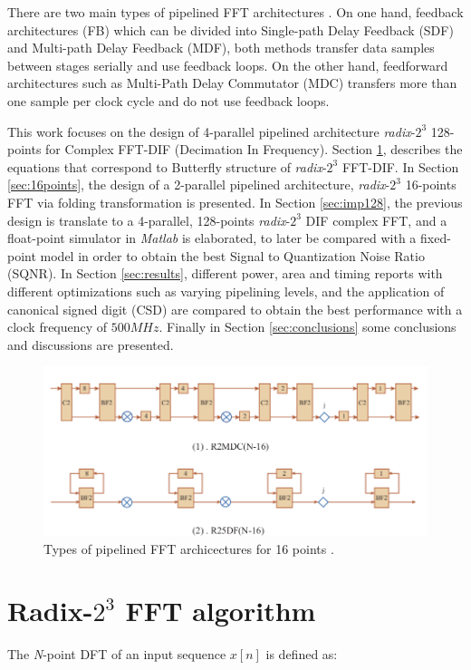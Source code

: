 \documentclass[journal,comsoc]{IEEEtran}
\begin{document}
There are two main types of pipelined FFT architectures  \cite{shousheng_he_designing_1998}. On one hand, feedback architectures (FB) which can be divided into Single-path Delay Feedback (SDF) and Multi-path Delay Feedback (MDF), both methods transfer data samples between stages serially and use feedback loops. On the other hand, feedforward architectures such as Multi-Path Delay Commutator (MDC) transfers more than one sample per clock cycle and do not use feedback loops.

This work focuses on the design of 4-parallel pipelined architecture \textit{radix}-$2^3$ 128-points for Complex FFT-DIF (Decimation In Frequency). Section \ref{sec:equa}, describes the equations that correspond to Butterfly structure of \textit{radix}-$2^3$ FFT-DIF. In Section \ref{sec:16points}, the design of a 2-parallel pipelined architecture, \textit{radix}-$2^3$ 16-points FFT via folding transformation is presented. In Section \ref{sec:imp128}, the previous design is translate to a 4-parallel, 128-points \textit{radix}-$2^3$ DIF complex FFT, and a float-point simulator in \textit{Matlab} is elaborated, to later be compared with a fixed-point model in order to obtain the best Signal to Quantization Noise Ratio (SQNR).
In Section \ref{sec:results}, different power, area and timing reports with different optimizations such as varying pipelining levels, and the application of canonical signed digit (CSD) are compared to obtain the best performance with a clock frequency of $500MHz$. Finally in Section \ref{sec:conclusions} some conclusions and discussions are presented.  
\begin{figure} 
	\centering
	\includegraphics[width=\linewidth]{Diagramas/types_FFT.png}
	\caption{Types of pipelined FFT archicectures for 16 points \cite{type_FFT_MIT}.}
	\label{fig:types_fft}
\end{figure}



\section{Radix-$2^3$ FFT algorithm} \label{sec:equa}
The \textit{N}-point DFT of an input sequence $x[n]$ is defined as:
\end{document}

